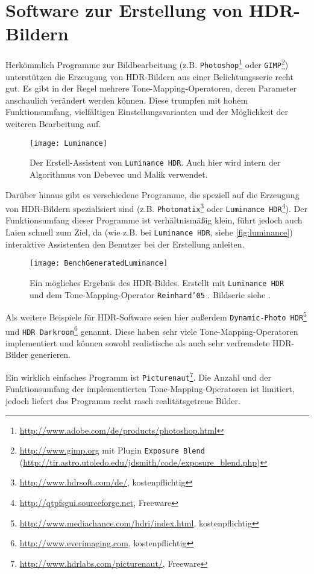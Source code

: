 \section{Software zur Erstellung von HDR-Bildern}
\label{sec:software}
Herkömmlich Programme zur Bildbearbeitung (z.B. \texttt{Photoshop}\footnote{\url{http://www.adobe.com/de/products/photoshop.html}} oder \texttt{GIMP}\footnote{\url{http://www.gimp.org} mit Plugin \texttt{Exposure Blend} (\url{http://tir.astro.utoledo.edu/jdsmith/code/exposure_blend.php})}) unterstützen die Erzeugung von \gls{HDR}-Bildern aus einer Belichtungsserie recht gut. Es gibt in der Regel mehrere \gls{Tone-Mapping}-Operatoren, deren Parameter anschaulich verändert werden können. Diese trumpfen mit hohem Funktionsumfang, vielfältigen Einstellungsvarianten und der Möglichkeit der weiteren Bearbeitung auf.
\begin{figure}[h]
  \begin{center}
    \texttt{[image: Luminance]}
    \caption{Der Erstell-Assistent von \texttt{Luminance HDR}. Auch hier wird intern der Algorithmus von Debevec und Malik \cite{paper} verwendet.}
    \label{fig:luminance}
  \end{center}
\end{figure}

Darüber hinaus gibt es verschiedene Programme, die speziell auf die Erzeugung von \gls{HDR}-Bildern spezialisiert sind (z.B. \texttt{Photomatix}\footnote{\url{http://www.hdrsoft.com/de/}, kostenpflichtig} oder \texttt{Luminance HDR}\footnote{\url{http://qtpfsgui.sourceforge.net}, Freeware}). Der Funktionsumfang dieser Programme ist verhältnismäßig klein, führt jedoch auch Laien schnell zum Ziel, da (wie z.B. bei \texttt{Luminance HDR}, siehe \autoref{fig:luminance}) interaktive Assistenten den Benutzer bei der Erstellung anleiten. 


\begin{figure}
  \begin{center}
    \texttt{[image: BenchGeneratedLuminance]}
    \caption{Ein mögliches Ergebnis des \gls{HDR}-Bildes. Erstellt mit \texttt{Luminance HDR} und dem \gls{Tone-Mapping}-Operator \texttt{Reinhard'05} \cite{Reinhard05}. Bildserie siehe \cite{tellone}.}
    \label{fig:luminance}
  \end{center}
\end{figure}

Als weitere Beispiele für HDR-Software seien hier außerdem \texttt{Dynamic-Photo HDR}\footnote{\url{http://www.mediachance.com/hdri/index.html}, kostenpflichtig} und \texttt{HDR Darkroom}\footnote{\url{http://www.everimaging.com}, kostenpflichtig} genannt. Diese haben sehr viele \gls{Tone-Mapping}-Operatoren implementiert und können sowohl realistische als auch sehr verfremdete \gls{HDR}-Bilder generieren. 

Ein wirklich einfaches Programm ist \texttt{Picturenaut}\footnote{\url{http://www.hdrlabs.com/picturenaut/}, Freeware}. Die Anzahl und der Funktionsumfang der implementierten \gls{Tone-Mapping}-Operatoren ist limitiert, jedoch liefert das Programm recht rasch realitätsgetreue Bilder.


